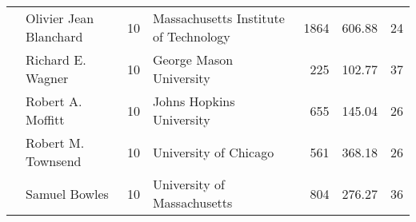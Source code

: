 \begin{tabular}{lp{3cm}r|lrrr}
   & Olivier Jean Blanchard &        10 & Massachusetts Institute of Technology &       1864 &  606.88 &          24 \\
   &      Richard E. Wagner &        10 &               George Mason University &        225 &  102.77 &          37 \\
   &      Robert A. Moffitt &        10 &              Johns Hopkins University &        655 &  145.04 &          26 \\
   &     Robert M. Townsend &        10 &                 University of Chicago &        561 &  368.18 &          26 \\
   &          Samuel Bowles &        10 &           University of Massachusetts &        804 &  276.27 &          36 \\
\bottomrule
\end{tabular}

